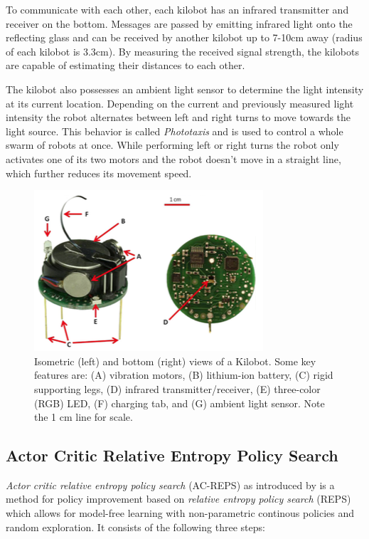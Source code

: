 \documentclass[twoside]{article}
\begin{document}
To communicate with each other, each kilobot has an infrared transmitter and
receiver on the bottom. Messages are passed by emitting infrared light onto the
reflecting glass and can be received by another kilobot up to 7-10cm away
(radius of each kilobot is 3.3cm). By measuring the received signal strength,
the kilobots are capable of estimating their distances to each other.

The kilobot also possesses an ambient light sensor to determine the light
intensity at its current location. Depending on the current and previously
measured light intensity the robot alternates between left and right turns to
move towards the light source. This behavior is called \emph{Phototaxis} and is
used to control a whole swarm of robots at once. While performing left or right
turns the robot only activates one of its two motors and the robot doesn't move
in a straight line, which further reduces its movement speed.

\begin{figure}[!htb]
    \centering
    \includegraphics[width=0.9\linewidth]{figures/kilobot.png}
    \caption{Isometric (left) and bottom (right) views of a Kilobot. Some key
        features are: (A) vibration motors, (B) lithium-ion battery, (C) rigid
        supporting legs, (D) infrared transmitter/receiver, (E) three-color
        (RGB) LED, (F) charging tab, and (G) ambient light sensor. Note the 1 cm
        line for scale.\cite{kilobot}}
\end{figure}

\subsection{Actor Critic Relative Entropy Policy Search}
\emph{Actor critic relative entropy policy search} (AC-REPS) as introduced by
\cite{acreps} is a method for policy improvement based on \emph{relative entropy
policy search} (REPS) \cite{reps} which allows for model-free learning with
non-parametric continous policies and random exploration. It consists of the
following three steps:
\end{document}
